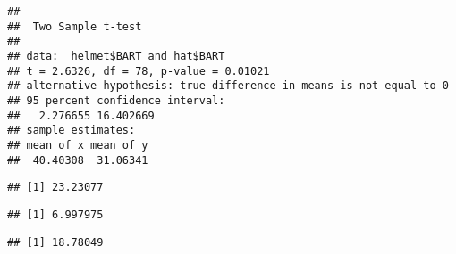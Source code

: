 \documentclass[]{article}
\newenvironment{Shaded}{\begin{snugshade}}{\end{snugshade}}
\newcommand{\KeywordTok}[1]{\textcolor[rgb]{0.13,0.29,0.53}{\textbf{#1}}}
\newcommand{\DataTypeTok}[1]{\textcolor[rgb]{0.13,0.29,0.53}{#1}}
\newcommand{\CommentTok}[1]{\textcolor[rgb]{0.56,0.35,0.01}{\textit{#1}}}
\newcommand{\OtherTok}[1]{\textcolor[rgb]{0.56,0.35,0.01}{#1}}
\newcommand{\OperatorTok}[1]{\textcolor[rgb]{0.81,0.36,0.00}{\textbf{#1}}}
\newcommand{\NormalTok}[1]{#1}
\begin{document}
\begin{Shaded}
\end{Shaded}

\begin{verbatim}
## 
##  Two Sample t-test
## 
## data:  helmet$BART and hat$BART
## t = 2.6326, df = 78, p-value = 0.01021
## alternative hypothesis: true difference in means is not equal to 0
## 95 percent confidence interval:
##   2.276655 16.402669
## sample estimates:
## mean of x mean of y 
##  40.40308  31.06341
\end{verbatim}

\begin{Shaded}
\end{Shaded}

\begin{verbatim}
## [1] 23.23077
\end{verbatim}

\begin{Shaded}
\end{Shaded}

\begin{verbatim}
## [1] 6.997975
\end{verbatim}

\begin{Shaded}
\end{Shaded}

\begin{verbatim}
## [1] 18.78049
\end{verbatim}

\begin{Shaded}
\end{Shaded}
\end{document}
